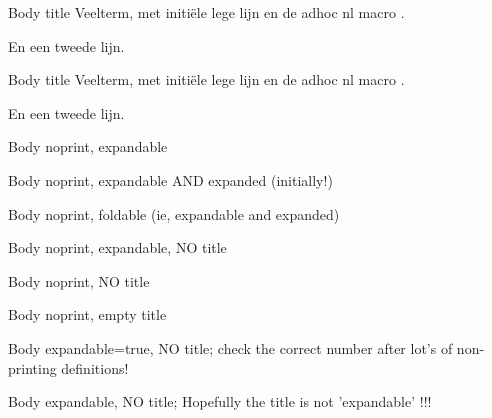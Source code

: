 \documentclass{ximera}
\begin{document}
\begin{definition}[title={Veelterm, met een lege lijn EN nl (en een komma en haakjes in de title)}]\nl

 Body title Veelterm, met initiële lege lijn en de adhoc nl macro .

 En een tweede lijn.
\end{definition}

\begin{definition}[title={Veelterm, zonder een lege lijn maar MET nl (en een komma en haakjes in de title)}]\nl
 Body title Veelterm, met initiële lege lijn en de adhoc nl macro .

 En een tweede lijn.
\end{definition}


\begin{definition}[print=false,expandable=true,title={Veelterm, expandable and no print}]
Body noprint, expandable 
\end{definition}

\begin{definition}[print=false,expandable=true,expanded,title={Veelterm, expandable and expanded}]
Body noprint, expandable AND expanded (initially!)
\end{definition}

\begin{definition}[print=false,foldable=true,title={Veelterm, foldable (synonym for expandable and expanded)}]
Body noprint,  foldable (ie, expandable and expanded)
\end{definition}

\begin{definition}[print=false,expandable]
Body noprint, expandable, NO title
\end{definition}

\begin{definition}[print=false]
Body noprint,  NO title
\end{definition}

\begin{definition}[print=false,title={}]
Body noprint,  empty title
\end{definition}

\begin{definition}[expandable=true]%
Body expandable=true, NO title; check the correct number after lot's of non-printing definitions!
\end{definition}

\begin{definition}[expandable]%
Body expandable, NO title; Hopefully the title is not 'expandable' !!!
\end{definition}
\end{document}

